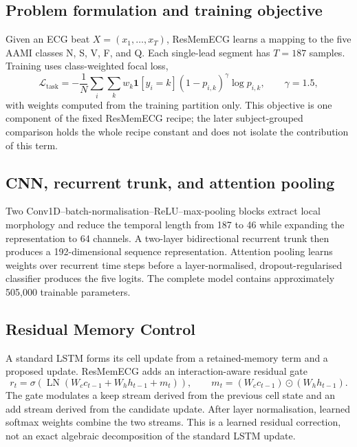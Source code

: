 \documentclass[review,12pt]{elsarticle}
\begin{document}
\subsection{Problem formulation and training objective}
Given an ECG beat $X=(x_1,\ldots,x_T)$, ResMemECG learns a mapping to the five
AAMI classes N, S, V, F, and Q. Each single-lead segment has $T=187$ samples.
Training uses class-weighted focal loss,
\begin{equation}
\mathcal{L}_{\mathrm{task}}=-\frac{1}{N}\sum_i\sum_k w_k
\mathbf{1}[y_i=k](1-p_{i,k})^{\gamma}\log p_{i,k},\qquad \gamma=1.5,
\end{equation}
with weights computed from the training partition only. This objective is one
component of the fixed ResMemECG recipe; the later subject-grouped comparison
holds the whole recipe constant and does not isolate the contribution of this
term.

\subsection{CNN, recurrent trunk, and attention pooling}
Two Conv1D--batch-normalisation--ReLU--max-pooling blocks extract local
morphology and reduce the temporal length from 187 to 46 while expanding the
representation to 64 channels. A two-layer bidirectional recurrent trunk then
produces a 192-dimensional sequence representation. Attention pooling learns
weights over recurrent time steps before a layer-normalised, dropout-regularised
classifier produces the five logits. The complete model contains approximately
505,000 trainable parameters.

\subsection{Residual Memory Control}
A standard LSTM forms its cell update from a retained-memory term and a proposed
update. ResMemECG adds an interaction-aware residual gate
\begin{equation}
r_t=\sigma\!\left(\operatorname{LN}(W_c c_{t-1}+W_h h_{t-1}+m_t)\right),
\qquad m_t=(W_c c_{t-1})\odot(W_h h_{t-1}).
\end{equation}
The gate modulates a keep stream derived from the previous cell state and an add
stream derived from the candidate update. After layer normalisation, learned
softmax weights combine the two streams. This is a learned residual correction,
not an exact algebraic decomposition of the standard LSTM update.
\end{document}

